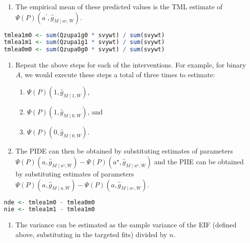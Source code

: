 \documentclass[
  12pt,
]{book}
\providecommand{\tightlist}{%
  \setlength{\itemsep}{0pt}\setlength{\parskip}{0pt}}
\theoremstyle{definition}
\theoremstyle{definition}
\theoremstyle{definition}
\newcommand{\1}{\mathbbm{1}}
\begin{document}
\begin{enumerate}
\def\labelenumi{\arabic{enumi}.}
\setcounter{enumi}{9}
\tightlist
\item
  The empirical mean of these predicted values is the TML estimate of
  \(\Psi(P)(a^\prime, \hat{g}_{M \mid a^{\star}, W})\).
\end{enumerate}

\begin{lstlisting}[language=R]
tmlea1m0 <- sum(Qzupa1g0 * svywt) / sum(svywt)
tmlea1m1 <- sum(Qzupa1g1 * svywt) / sum(svywt)
tmlea0m0 <- sum(Qzupa0g0 * svywt) / sum(svywt)
\end{lstlisting}

\begin{enumerate}
\def\labelenumi{\arabic{enumi}.}
\setcounter{enumi}{10}
\tightlist
\item
  Repeat the above steps for each of the interventions. For example, for
  binary \(A\), we would execute these steps a total of three times to
  estimate:

  \begin{enumerate}
  \def\labelenumii{\arabic{enumii}.}
  \tightlist
  \item
    \(\Psi(P)(1,\hat{g}_{M \mid 1, W})\),
  \item
    \(\Psi(P)(1,\hat{g}_{M \mid 0, W})\), and
  \item
    \(\Psi(P)(0,\hat{g}_{M \mid 0, W})\).
  \end{enumerate}
\item
  The PIDE can then be obtained by substituting estimates of parameters
  \(\Psi(P)(a,\hat{g}_{M \mid a^{\star}, W}) - \Psi(P)(a^{\star},\hat{g}_{M \mid a^{\star}, W})\) and the PIIE
  can be obtained by substituting estimates of parameters
  \(\Psi(P)(a,\hat{g}_{M \mid a,W}) - \Psi(P)(a, \hat{g}_{M \mid a^{\star}, W})\).
\end{enumerate}

\begin{lstlisting}[language=R]
nde <- tmlea1m0 - tmlea0m0
nie <- tmlea1m1 - tmlea1m0
\end{lstlisting}

\begin{enumerate}
\def\labelenumi{\arabic{enumi}.}
\setcounter{enumi}{12}
\tightlist
\item
  The variance can be estimated as the sample variance of the EIF (defined
  above, substituting in the targeted fits) divided by \(n\).
\end{enumerate}
\end{document}
